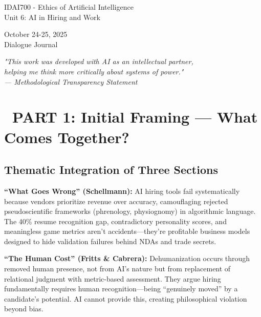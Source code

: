 \documentclass[12pt,letterpaper]{article}
\begin{document}
\begin{titlepage}
{\large IDAI700 - Ethics of Artificial Intelligence\\
Unit 6: AI in Hiring and Work}

\vspace{1cm}

{\large October 24-25, 2025\\
Dialogue Journal}

\vspace{2cm}

\textit{\color{softgray}"This work was developed with AI as an intellectual partner,\\helping me think more critically about systems of power."\\— Methodological Transparency Statement}

\end{titlepage}

\newpage
\section*{\color{primaryblue}\faBookOpen\ PART 1: Initial Framing — What Comes Together?}

\subsection*{Thematic Integration of Three Sections}

\begin{keyfindings}
\textbf{``What Goes Wrong'' (Schellmann):} AI hiring tools fail systematically because vendors prioritize revenue over accuracy, camouflaging rejected pseudoscientific frameworks (phrenology, physiognomy) in algorithmic language. The 40\% resume recognition gap, contradictory personality scores, and meaningless game metrics aren't accidents—they're profitable business models designed to hide validation failures behind NDAs and trade secrets.
\end{keyfindings}

\vspace{-4pt}
\begin{keyfindings}
\textbf{``The Human Cost'' (Fritts \& Cabrera):} Dehumanization occurs through removed human presence, not from AI's nature but from replacement of relational judgment with metric-based assessment. They argue hiring fundamentally requires human recognition—being ``genuinely moved'' by a candidate's potential. AI cannot provide this, creating philosophical violation beyond bias.
\end{keyfindings}
\end{document}
